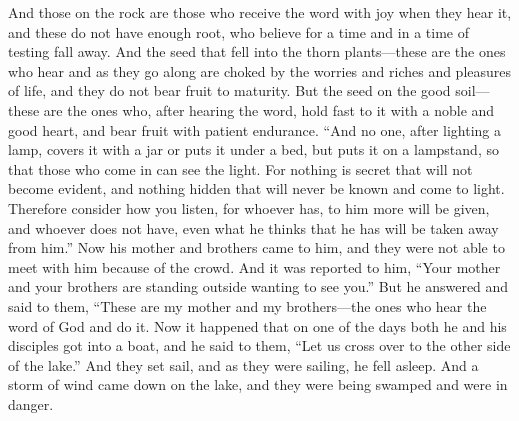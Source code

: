 \begin{biblechapter}
\verse And those on the rock are those who receive the word with joy when they hear it, and these do not have enough root, who believe for a time and in a time of testing fall away.
\verse And the seed that fell into the thorn plants—these are the ones who hear and as they go along are choked by the worries and riches and pleasures of life, and they do not bear fruit to maturity.
\verse But the seed on the good soil—these are the ones who, after hearing the word, hold fast to it with a noble and good heart, and bear fruit with patient endurance.
 “And no one, after lighting a lamp, covers it with a jar or puts it under a bed, but puts it on a lampstand, so that those who come in can see the light.
\verse For nothing is secret that will not become evident, and nothing hidden that will never be known and come to light.
\verse Therefore consider how you listen, for whoever has, to him more will be given, and whoever does not have, even what he thinks that he has will be taken away from him.”
 Now his mother and brothers came to him, and they were not able to meet with him because of the crowd.
\verse And it was reported to him, “Your mother and your brothers are standing outside wanting to see you.”
\verse But he answered and said to them, “These are my mother and my brothers—the ones who hear the word of God and do it.
 Now it happened that on one of the days both he and his disciples got into a boat, and he said to them, “Let us cross over to the other side of the lake.” And they set sail,
\verse and as they were sailing, he fell asleep. And a storm of wind came down on the lake, and they were being swamped and were in danger.

\end{biblechapter}
